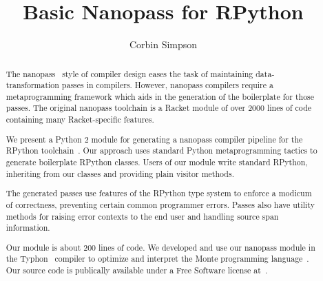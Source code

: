 \documentclass[sigconf, 10pt]{acmart}
\begin{document}
\title{Basic Nanopass for RPython}


\author{Corbin Simpson}


\begin{abstract}
The nanopass~\cite{nanopass} style of compiler design eases the task of
maintaining data-transformation passes in compilers. However, nanopass
compilers require a metaprogramming framework which aids in the generation of
the boilerplate for those passes. The original nanopass toolchain is a Racket
module of over 2000 lines of code containing many Racket-specific features.

We present a Python 2 module for generating a nanopass compiler pipeline for
the RPython toolchain~\cite{Ancona:2007:RST:1297081.1297091}. Our approach
uses standard Python metaprogramming tactics to generate boilerplate RPython
classes. Users of our module write standard RPython, inheriting from our
classes and providing plain visitor methods.

The generated passes use features of the RPython type system to enforce a
modicum of correctness, preventing certain common programmer errors. Passes
also have utility methods for raising error contexts to the end user and
handling source span information.

Our module is about 200 lines of code. We developed and use our nanopass
module in the Typhon~\cite{typhon} compiler to optimize and interpret the
Monte programming language~\cite{monte}. Our source code is publically
available under a Free Software license at~\cite{typhonNanopass}.
\end{abstract}








\maketitle
\end{document}
